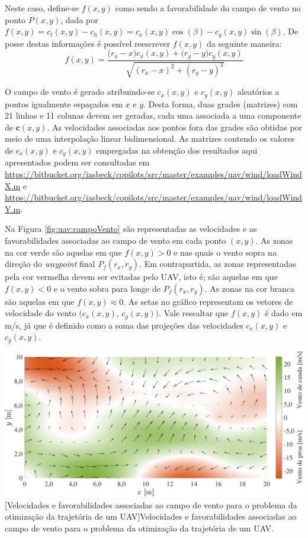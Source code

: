 Neste caso, define-se $ f(x, y) $ como sendo a favorabilidade do campo de vento no ponto $ P(x, y) $, dada por  $ f(x, y) = c_t(x,y) - c_h(x,y) = c_x(x,y) \cos(\beta) - c_y(x,y) \sin(\beta)$. De posse destas informações é possível reescrever $ f(x,y) $ da seguinte maneira:
%
\begin{equation}
	f(x,y) = \frac{\big( r_x - x \big) c_x(x,y) + \big( r_y - y \big) c_y(x,y)}{\sqrt{(r_x - x)^2 + (r_y - y)^2 }}
\end{equation}  

O campo de vento é gerado atribuindo-se $ c_x(x, y) $ e $ c_y(x, y) $ aleatórios a pontos igualmente espaçados em $ x $ e $ y $. Desta forma, duas grades (matrizes) com 21 linhas e 11 colunas devem ser geradas, cada uma associada a uma componente de $ \mathbf{c}(x,y) $. As velocidades associadas aos pontos fora das grades são obtidas por meio de uma interpolação linear bidimensional. As matrizes contendo os valores de $ c_x(x, y) $ e $ c_y(x, y) $ empregadas na obtenção dos resultados aqui apresentados podem ser consultadas em \url{https://bitbucket.org/iasbeck/copilots/src/master/examples/uav/wind/loadWindX.m} e \url{https://bitbucket.org/iasbeck/copilots/src/master/examples/uav/wind/loadWindY.m}.

Na Figura \ref{fig:uav:campoVento} são representadas as velocidades e as favorabilidades associadas ao campo de vento em cada ponto $ (x,y) $. As zonas na cor verde são aquelas em que $ f(x,y) > 0 $ e nas quais o vento sopra na direção do \textit{waypoint} final $ P_f(r_x, r_y) $. Em contrapartida, as zonas representadas pela cor vermelha devem ser evitadas pelo UAV, isto é; são aquelas em que $ f(x,y) < 0 $ e o vento sobra para longe de $ P_f(r_x, r_y) $. As zonas na cor branca são aquelas em que $ f(x,y) \approx 0 $. As setas no gráfico representam os vetores de velocidade do vento $ \big( c_x(x,y), \, c_y(x,y) \big) $. Vale ressaltar que $ f(x,y) $ é dado em m/s, já que é definido como a soma das projeções das velocidades $ c_x(x,y) $ e $ c_y(x,y) $. 

\noindent	
\begin{minipage}{\textwidth}
	\vspace{\onelineskip}
	\centering
	\includegraphics[scale=0.5]{fig/resultados/uav/obs/wind}
	[Velocidades e favorabilidades associadas ao campo de vento para o problema da otimização da trajetória de um UAV]{Velocidades e favorabilidades associadas ao campo de vento para o problema da otimização da trajetória de um UAV.}
	\label{fig:uav:campoVento}
	\vspace{\onelineskip}
\end{minipage} 

